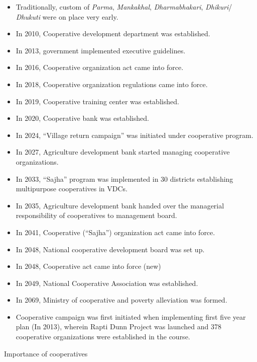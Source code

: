 \documentclass[
  openany]{book}
\begin{document}
\begin{itemize}
\item
  Traditionally, custom of \emph{Parma}, \emph{Mankakhal}, \emph{Dharmabhakari}, \emph{Dhikuri}/ \emph{Dhukuti} were on place very early.
\item
  In 2010, Cooperative development department was established.
\item
  In 2013, government implemented executive guidelines.
\item
  In 2016, Cooperative organization act came into force.
\item
  In 2018, Cooperative organization regulations came into force.
\item
  In 2019, Cooperative training center was established.
\item
  In 2020, Cooperative bank was established.
\item
  In 2024, ``Village return campaign'' was initiated under cooperative program.
\item
  In 2027, Agriculture development bank started managing cooperative organizations.
\item
  In 2033, ``Sajha'' program was implemented in 30 districts establishing multipurpose cooperatives in VDCs.
\item
  In 2035, Agriculture development bank handed over the managerial responsibility of cooperatives to management board.
\item
  In 2041, Cooperative (``Sajha'') organization act came into force.
\item
  In 2048, National cooperative development board was set up.
\item
  In 2048, Cooperative act came into force (new)
\item
  In 2049, National Cooperative Association was established.
\item
  In 2069, Ministry of cooperative and poverty alleviation was formed.
\item
  Cooperative campaign was first initiated when implementing first five year plan (In 2013), wherein Rapti Dunn Project was launched and 378 cooperative organizations were established in the course.
\end{itemize}

Importance of cooperatives
\end{document}
